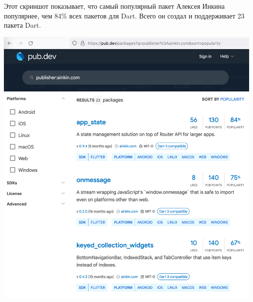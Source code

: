 
Этот скриншот показывает, что самый популярный пакет Алексея Инкина популярнее,
чем 84\% всех пакетов для Dart.
Всего он создал и поддерживает 23 пакета Dart.

\begin{center}
    \includegraphics[width=40em]{pub-ainkin-p1}
\end{center}
\WillContinue
\pagebreak

